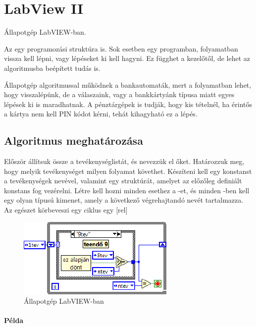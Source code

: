 \documentclass[../../main.tex]{subfiles}
\begin{document}
\section{LabView II}

\begin{fulltheorem}
  Állapotgép LabVIEW-ban.
\end{fulltheorem}

Az  egy programozási struktúra is. Sok esetben egy programban,
folyamatban vissza kell lépni, vagy lépéseket ki kell hagyni. Ez függhet a
kezelőtől, de lehet az algoritmusba beépített tudás is.

Állapotgép algoritmussal működnek a bankautomaták, mert a folyamatban lehet,
hogy visszalépünk, de a válaszaink, vagy a bankkártyánk típusa miatt egyes
lépések ki is maradhatnak. A pénztárgépek is tudják, hogy kis tételnél, ha
érintős a kártya nem kell PIN kódot kérni, tehát kihagyható ez a lépés.

\subsection{Algoritmus meghatározása}

Először állítsuk össze a tevékenységlistát, és nevezzük el őket.
Határozzuk meg, hogy melyik tevékenységet milyen folyamat követhet.
Készíteni kell egy  konstanst a tevékenységek nevével, valamint egy
 struktúrát, amelyet az előzőleg definiált konstans fog vezérelni.
Létre kell hozni minden esethez a -et, és minden -ben kell
egy olyan  típusú kimenet, amely a következő végrehajtandó 
nevét tartalmazza. Az egészet körbeveszi egy  ciklus egy
[rel]
\begin{figure}[H]
  \centering
  \includegraphics[width=.6\textwidth]{../../static/lw/state-machine.png}
  \caption{Állapotgép LabVIEW-ban}
  \label{fig:lv/sm}
\end{figure}

\paragraph*{Példa}
\end{document}

